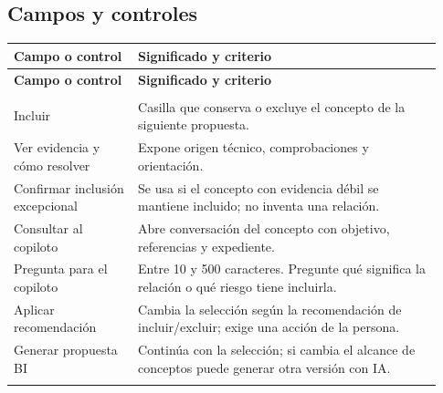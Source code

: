 \subsection{Campos y controles}
\begingroup
\fontsize{10}{12.5}\selectfont
\setlength{\tabcolsep}{5pt}
\renewcommand{\arraystretch}{1.15}
\begin{longtable}{@{}>{\RaggedRight\arraybackslash}p{0.27\linewidth}>{\RaggedRight\arraybackslash}p{0.66\linewidth}@{}}
\toprule
\textbf{Campo o control} & \textbf{Significado y criterio} \\
\midrule
\endfirsthead
\toprule
\textbf{Campo o control} & \textbf{Significado y criterio} \\
\midrule
\endhead
\midrule
\multicolumn{2}{r}{\footnotesize Continúa en la página siguiente}\\
\endfoot
\bottomrule
\endlastfoot
Incluir & Casilla que conserva o excluye el concepto de la siguiente propuesta. \\
\addlinespace[3pt]
Ver evidencia y cómo resolver & Expone origen técnico, comprobaciones y orientación. \\
\addlinespace[3pt]
Confirmar inclusión excepcional & Se usa si el concepto con evidencia débil se mantiene incluido; no inventa una relación. \\
\addlinespace[3pt]
Consultar al copiloto & Abre conversación del concepto con objetivo, referencias y expediente. \\
\addlinespace[3pt]
Pregunta para el copiloto & Entre 10 y 500 caracteres. Pregunte qué significa la relación o qué riesgo tiene incluirla. \\
\addlinespace[3pt]
Aplicar recomendación & Cambia la selección según la recomendación de incluir/excluir; exige una acción de la persona. \\
\addlinespace[3pt]
Generar propuesta BI & Continúa con la selección; si cambia el alcance de conceptos puede generar otra versión con IA. \\
\addlinespace[3pt]
\end{longtable}
\endgroup

